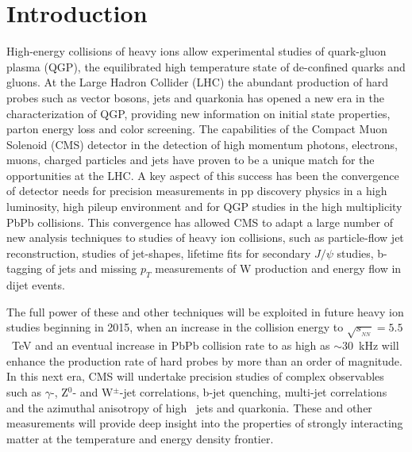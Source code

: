 \section{Introduction}
\label{sec:intro}
High-energy collisions of heavy ions allow experimental studies of quark-gluon plasma (QGP), the 
equilibrated high temperature state of de-confined quarks and gluons. 
At the Large Hadron Collider (LHC) the abundant production of hard probes such as vector bosons, jets and quarkonia 
has opened a new era in the characterization of QGP, providing new information on initial state properties, parton energy loss
and color screening.  The capabilities of the Compact Muon Solenoid (CMS) detector in the detection of 
high momentum photons, electrons, muons, charged particles and jets have proven to be a unique match for the 
opportunities at the LHC. A key aspect of this success has been the convergence of detector needs for precision 
measurements in pp discovery physics in a high luminosity, high pileup environment and for QGP studies 
in the high multiplicity PbPb collisions. 
This convergence has allowed CMS to adapt a large number of new analysis techniques to studies of heavy ion collisions,
such as particle-flow jet reconstruction, studies of jet-shapes, lifetime fits for secondary $J/\psi$ studies, 
b-tagging of jets and missing $p_T$ measurements of W production and energy flow in dijet events. 

The full power of these and other techniques will be exploited in future heavy ion studies beginning in 2015,
when an increase in the collision energy to $\sqrt{s_{_{NN}}} = 5.5$~TeV and an eventual increase in PbPb collision rate 
to as high as $\sim 30$~kHz \cite{Jowett:2012priv} will enhance the production rate of hard probes by more than an order of magnitude. 
In this next era, CMS will undertake precision studies of complex observables such as $\gamma$-, Z$^0$- and W$^\pm$-jet correlations,
b-jet quenching, multi-jet correlations and the azimuthal anisotropy of high \pt\ jets and quarkonia. These and other measurements
will provide deep insight into the properties of strongly interacting matter at the temperature and energy density frontier.

